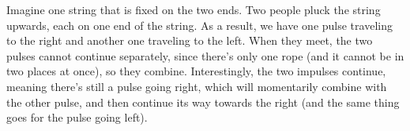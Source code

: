 \documentclass[12pt,noauthor,nooutcomes, instructornotes]{ximera}
\begin{document}
\begin{question} Imagine one string that is fixed on the two ends. Two people pluck the string upwards, each on one end of the string. As a result, we have one pulse traveling to the right and another one traveling to the left. When they meet, the two pulses cannot continue separately, since there's only one rope (and it cannot be in two places at once), so they combine. Interestingly, the two impulses continue, meaning there's still a pulse going right, which will momentarily combine with the other pulse, and then continue its way towards the right (and the same thing goes for the pulse going left).

\begin{center}




\end{center}










\end{question}
\end{document}
